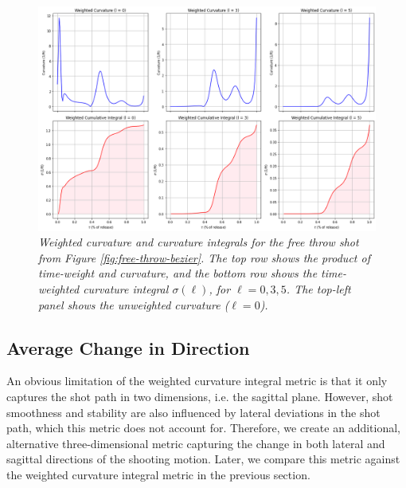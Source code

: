 \documentclass{article}
\begin{document}
          \begin{figure}[H]
              \centering
              \includegraphics[width=0.8\linewidth]{reports/arxiv/weights.png}
              \caption{\it Weighted curvature and curvature integrals for the free throw shot from Figure \ref{fig:free-throw-bezier}. The top row shows the product of time-weight and curvature, and the bottom row shows the time-weighted curvature integral \(\sigma(\ell)\), for \(\ell = 0, 3, 5\). The top-left panel shows the unweighted curvature (\(\ell = 0\)).}
              \label{fig:weights}
          \end{figure}

    \subsection{Average Change in Direction}
    \label{sec:average-change-in-direction}
    
      An obvious limitation of the weighted curvature integral metric is that it only captures the shot path in two dimensions, i.e. the sagittal plane. However, shot smoothness and stability are also influenced by lateral deviations in the shot path, which this metric does not account for. Therefore, we create an additional, alternative three-dimensional metric capturing the change in both lateral and sagittal directions of the shooting motion. Later, we compare this metric against the weighted curvature integral metric in the previous section.
\end{document}
